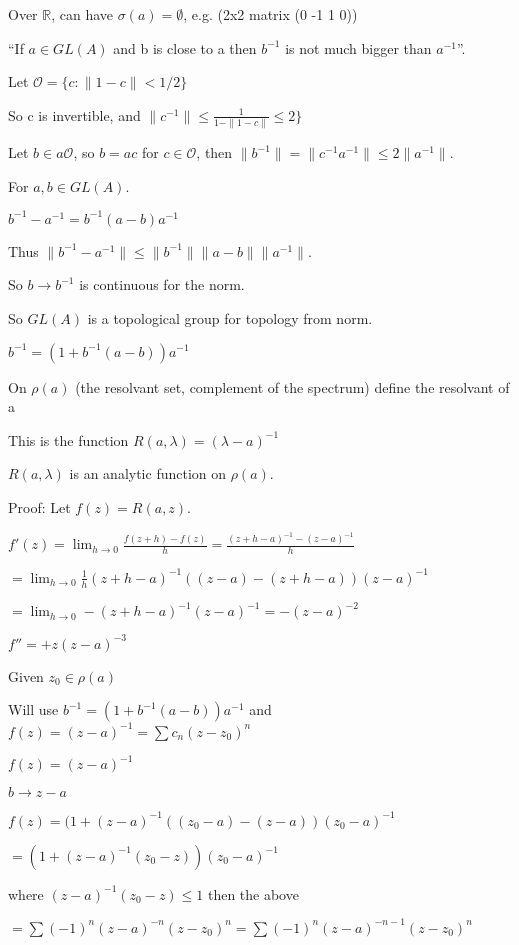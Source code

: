 \documentclass[12pt]{article}
\begin{document}
Over $\mathds{R}$, can have $\sigma(a) = \emptyset$, e.g. (2x2 matrix (0 -1 1 0))

\noindent
``If $a \in GL(A)$ and b is close to a then $b^{-1}$ is not much bigger than $a^{-1}$''.

Let $\mathscr{O} = \{c : \|1 - c\| < 1\slash 2 \}$

So c is invertible, and $\|c^{-1}\| \leq \frac{1}{1 - \|1-c\|} \leq 2\}$

Let $b \in a\mathscr{O}$, so $b = ac$ for $c \in \mathscr{O}$, then $\|b^{-1}\| = \|c^{-1}a^{-1}\| \leq 2\|a^{-1}\|$.

For $a, b \in GL(A)$.

$b^{-1} - a^{-1} = b^{-1}(a - b)a^{-1}$

Thus $\|b^{-1} - a^{-1}\| \leq \|b^{-1}\|\|a - b\|\|a^{-1}\|$.

So $b \to b^{-1}$ is continuous for the norm.

So $GL(A)$ is a topological group for topology from norm.

$b^{-1} = (1 + b^{-1}(a - b))a^{-1}$

\noindent
On $\rho (a)$ (the resolvant set, complement of the spectrum) define the resolvant of a

This is the function $R(a, \lambda) = (\lambda - a)^{-1}$

\noindent
$R(a, \lambda)$ is an analytic function on $\rho (a)$.

\noindent
Proof: Let $f(z) = R(a, z)$.

$f'(z) = \lim_{h \to 0} \frac{f(z + h) - f(z)}{h} = \frac{(z + h - a)^{-1} - (z - a)^{-1}}{h}$ 

$ = \lim_{h \to 0}\frac{1}{h} (z + h - a)^{-1} ((z - a) - (z + h - a))(z - a)^{-1}$

$= \lim_{h \to 0} -(z + h - a)^{-1}(z - a)^{-1} = -(z - a)^{-2}$

$f'' = +z(z - a)^{-3}$

Given $z_0 \in \rho (a)$

Will use $b^{-1} = (1 + b^{-1}(a - b))a^{-1}$ and $f(z) = (z - a)^{-1} = \sum c_n(z - z_0)^n$

$f(z) = (z - a)^{-1}$

$b \to z - a$

$f(z) = (1 + (z - a)^{-1}((z_0 - a) - (z - a)) (z_0 - a)^{-1}$

$=(1 + (z - a)^{-1}(z_0 - z))(z_0 - a)^{-1}$

where $(z - a)^{-1}(z_0 - z) \leq 1$ then the above

$=\sum(-1)^{n}(z - a)^{-n}(z - z_0)^n = \sum(-1)^n(z-a)^{-n-1}(z-z_0)^n$
\end{document}

